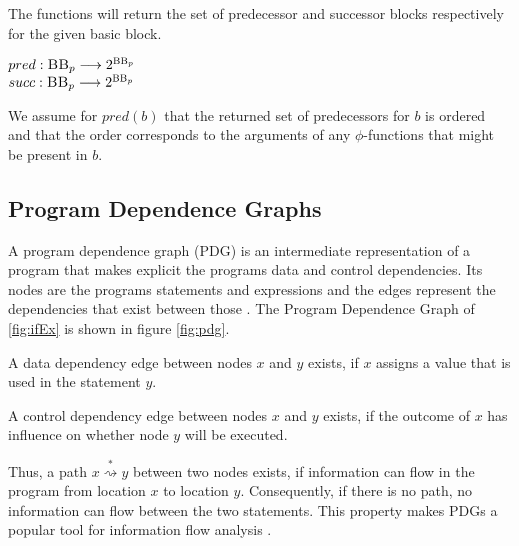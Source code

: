 \begin{definition}\label{def:succPred}
    The functions will return the set of predecessor and successor blocks respectively for the given basic block.
    \begin{center}
        $pred: \textsc{BB}_p \longrightarrow 2^{\textsc{BB}_p}$\\
        $succ: \textsc{BB}_p \longrightarrow 2^{\textsc{BB}_p}$
    \end{center}
    We assume for $pred(b)$ that the returned set of predecessors for $b$ is ordered and that the order corresponds to the arguments of any $\phi$-functions that might be present in $b$.
\end{definition}

\subsection{Program Dependence Graphs}
A program dependence graph (PDG) is an intermediate representation of a program that makes explicit the programs data and control dependencies. Its nodes are the programs statements and expressions and the edges represent the dependencies that exist between those \cite{ferrante87}. The Program Dependence Graph of \ref{fig:ifEx} is shown in figure \ref{fig:pdg}.

A data dependency edge between nodes $x$ and $y$ exists, if $x$ assigns a value that is used in the statement $y$.

A control dependency edge between nodes $x$ and $y$ exists, if the outcome of $x$ has influence on whether node $y$ will be executed.

Thus, a path $x \stackrel{*}{\rightsquigarrow } y$ between two nodes exists, if information can flow in the program from location $x$ to location $y$. Consequently, if there is no path, no information can flow between the two statements. This property makes PDGs a popular tool for information flow analysis \cite{horwitz88,giffhorn12}.

